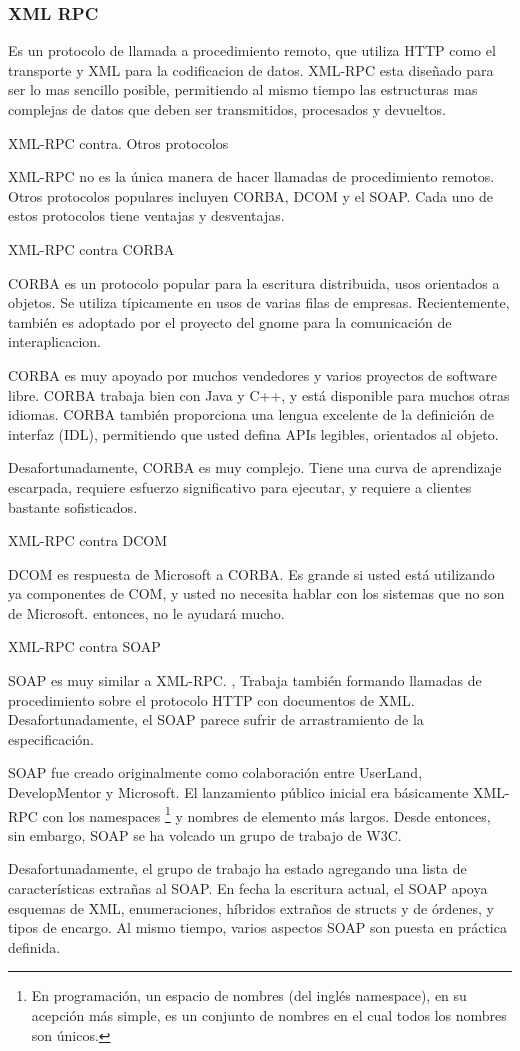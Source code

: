 \subsubsection{XML RPC}
Es un protocolo de llamada a procedimiento remoto, que utiliza HTTP como el transporte y XML para la codificacion de datos. XML-RPC esta diseñado para ser lo mas sencillo posible, permitiendo al mismo tiempo las estructuras mas complejas de datos que deben ser transmitidos, procesados y devueltos.

XML-RPC contra. Otros protocolos

XML-RPC no es la única manera de hacer llamadas de procedimiento remotos. Otros protocolos populares incluyen CORBA, DCOM y el SOAP. Cada uno de estos protocolos tiene ventajas y desventajas.

XML-RPC contra CORBA

CORBA es un protocolo popular para la escritura distribuida, usos orientados a objetos. Se utiliza típicamente en usos de varias filas de empresas. Recientemente, también es adoptado por el proyecto del gnome para la comunicación de interaplicacion.

CORBA es muy apoyado por muchos vendedores y varios proyectos de software libre. CORBA trabaja bien con Java y C++, y está disponible para muchos otras idiomas. CORBA también proporciona una lengua excelente de la definición de interfaz (IDL), permitiendo que usted defina APIs legibles, orientados al objeto.

Desafortunadamente, CORBA es muy complejo. Tiene una curva de aprendizaje escarpada, requiere esfuerzo significativo para ejecutar, y requiere a clientes bastante sofisticados.

XML-RPC contra DCOM

DCOM es respuesta de Microsoft a CORBA. Es grande si usted está utilizando ya componentes de COM, y usted no necesita hablar con los sistemas que no son de Microsoft. entonces, no le ayudará mucho.

XML-RPC contra SOAP

SOAP es muy similar a XML-RPC. , Trabaja también formando llamadas de procedimiento sobre el protocolo HTTP con documentos de XML. Desafortunadamente, el SOAP parece sufrir de arrastramiento de la especificación.

SOAP fue creado originalmente como colaboración entre UserLand, DevelopMentor y Microsoft. El lanzamiento público inicial era básicamente XML-RPC con los namespaces \footnote{En programación, un espacio de nombres (del inglés namespace), en su acepción más simple, es un conjunto de nombres en el cual todos los nombres son únicos.} y nombres de elemento más largos. Desde entonces, sin embargo, SOAP se ha volcado un grupo de trabajo de W3C.

Desafortunadamente, el grupo de trabajo ha estado agregando una lista de características extrañas al SOAP. En fecha la escritura actual, el SOAP apoya esquemas de XML, enumeraciones, híbridos extraños de structs y de órdenes, y tipos de encargo. Al mismo tiempo, varios aspectos SOAP son puesta en práctica definida.

%
